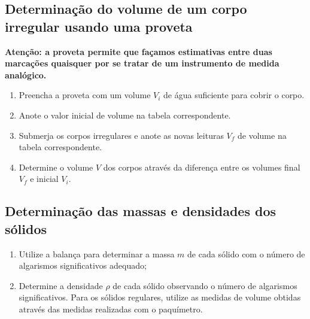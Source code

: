 \subsection{Determinação do volume de um corpo irregular usando uma proveta}

\textbf{Atenção: a proveta permite que façamos estimativas entre duas marcações quaisquer por se tratar de um instrumento de medida analógico.}

\begin{enumerate}
    \item Preencha a proveta com um volume $V_i$ de água suficiente para cobrir o corpo.
    \item Anote o valor inicial de volume na tabela correspondente.
    \item Submerja os corpos irregulares e anote as novas leituras $V_f$ de volume na tabela correspondente.
    \item Determine o volume $V$ dos corpos através da diferença entre os volumes final $V_f$ e inicial $V_i$.
\end{enumerate}

\subsection{Determinação das massas e densidades dos sólidos}

\begin{enumerate}
     \item Utilize a balança para determinar a massa $m$ de cada sólido com o número de algarismos significativos adequado;
     \item Determine a densidade $\rho$ de cada sólido observando o número de algarismos significativos. Para os sólidos regulares, utilize as medidas de volume obtidas através das medidas realizadas com o paquímetro.
\end{enumerate}

\cleardoublepage

